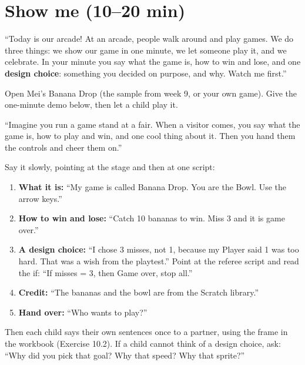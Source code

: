 \section{Show me (10--20 min)}
\begin{teacherscript}
\enquote{Today is our arcade! At an arcade, people walk around and play games. We do three things: we show our game in one minute, we let someone play it, and we celebrate. In your minute you say what the game is, how to win and lose, and one \textbf{design choice}: something you decided on purpose, and why. Watch me first.}

Open Mei's Banana Drop (the sample from week 9, or your own game). Give the one-minute demo below, then let a child play it.
\end{teacherscript}

\begin{analogy}
\enquote{Imagine you run a game stand at a fair. When a visitor comes, you say what the game is, how to play and win, and one cool thing about it. Then you hand them the controls and cheer them on.}
\end{analogy}

\begin{workedexample}
Say it slowly, pointing at the stage and then at one script:
\begin{enumerate}[leftmargin=1.4em,itemsep=1pt]
  \item \textbf{What it is:} \enquote{My game is called Banana Drop. You are the Bowl. Use the arrow keys.}
  \item \textbf{How to win and lose:} \enquote{Catch 10 bananas to win. Miss 3 and it is game over.}
  \item \textbf{A design choice:} \enquote{I chose 3 misses, not 1, because my Player said 1 was too hard. That was a wish from the playtest.} Point at the referee script and read the if: \enquote{If misses = 3, then Game over, stop all.}
  \item \textbf{Credit:} \enquote{The bananas and the bowl are from the Scratch library.}
  \item \textbf{Hand over:} \enquote{Who wants to play?}
\end{enumerate}
\begin{center}
\begin{scratch}[scale=0.85]
\end{scratch}
\end{center}
Then each child says their own sentences once to a partner, using the frame in the workbook (Exercise 10.2). If a child cannot think of a design choice, ask: \enquote{Why did you pick that goal? Why that speed? Why that sprite?}
\end{workedexample}

